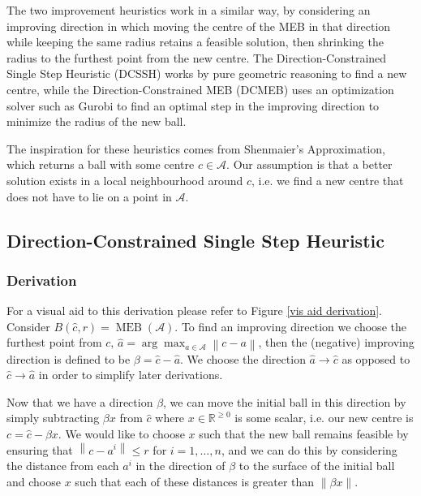 \documentclass[11pt,twoside]{report}
\newcommand{\A}{\mathcal{A}} %
\newcommand{\norm}[1]{\left\lVert#1\right\rVert} %
\DeclareMathOperator{\MEB}{MEB}
\theoremstyle{definition}
\numberwithin{theorem}{section}
\numberwithin{definition}{section}
\numberwithin{lemma}{section}
\numberwithin{proposition}{section}
\numberwithin{equation}{section}
\numberwithin{figure}{section}
\begin{document}
The two improvement heuristics work in a similar way, by considering an improving direction in which moving the centre of the MEB in that direction while keeping the same radius retains a feasible solution, then shrinking the radius to the furthest point from the new centre. The Direction-Constrained Single Step Heuristic (DCSSH) works by pure geometric reasoning to find a new centre, while the Direction-Constrained MEB (DCMEB) uses an optimization solver such as Gurobi to find an optimal step in the improving direction to minimize the radius of the new ball.

The inspiration for these heuristics comes from Shenmaier's Approximation, which returns a ball with some centre $c\in\A$. Our assumption is that a better solution exists in a local neighbourhood around $c$, i.e. we find a new centre that does not have to lie on a point in $\A$.

\subsection{Direction-Constrained Single Step Heuristic}
\subsubsection{Derivation}
For a visual aid to this derivation please refer to Figure \ref{vis aid derivation}. Consider $B(\hat{c}, r) = \MEB(\A)$. To find an improving direction we choose the furthest point from $c$, $\hat{a}=\arg\max_{a\in\A}\norm{c-a}$, then the (negative) improving direction is defined to be $\beta=\hat{c}-\hat{a}$. We choose the direction $\hat{a}\to\hat{c}$ as opposed to $\hat{c}\to\hat{a}$ in order to simplify later derivations.

Now that we have a direction $\beta$, we can move the initial ball in this direction by simply subtracting $\beta x$ from $\hat{c}$ where $x\in\mathbb{R}^{\geq0}$ is some scalar, i.e. our new centre is $c=\hat{c}-\beta x$. We would like to choose $x$ such that the new ball remains feasible by ensuring that $\norm{c-a^i}\leq r$ for $i=1,\ldots,n$, and we can do this by considering the distance from each $a^i$ in the direction of $\beta$ to the surface of the initial ball and choose $x$ such that each of these distances is greater than $\norm{\beta x}$.
\end{document}
